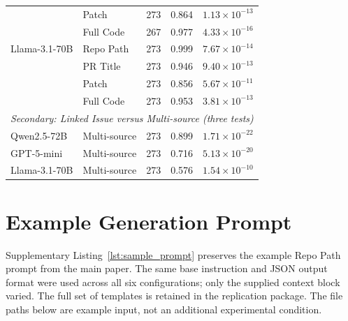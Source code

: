 \documentclass[11pt,a4paper]{article}
\begin{document}
\begin{table}[htbp]
\begin{tabular}{llrrr}
 & Patch & 273 & 0.864 & $1.13\times10^{-13}$ \\
 & Full Code & 267 & 0.977 & $4.33\times10^{-16}$ \\
Llama-3.1-70B & Repo Path & 273 & 0.999 & $7.67\times10^{-14}$ \\
 & PR Title & 273 & 0.946 & $9.40\times10^{-13}$ \\
 & Patch & 273 & 0.856 & $5.67\times10^{-11}$ \\
 & Full Code & 273 & 0.953 & $3.81\times10^{-13}$ \\
\midrule
\multicolumn{5}{l}{\textit{Secondary: Linked Issue versus Multi-source (three tests)}} \\
Qwen2.5-72B & Multi-source & 273 & 0.899 & $1.71\times10^{-22}$ \\
GPT-5-mini & Multi-source & 273 & 0.716 & $5.13\times10^{-20}$ \\
Llama-3.1-70B & Multi-source & 273 & 0.576 & $1.54\times10^{-10}$ \\
\bottomrule
\end{tabular}
\end{table}
\FloatBarrier

\section{Example Generation Prompt}

Supplementary Listing~\ref{lst:sample_prompt} preserves the example Repo Path prompt
from the main paper. The same base instruction and JSON output format were used
across all six configurations; only the supplied context block varied. The full
set of templates is retained in the replication package. The file paths below are
example input, not an additional experimental condition.


\end{document}
